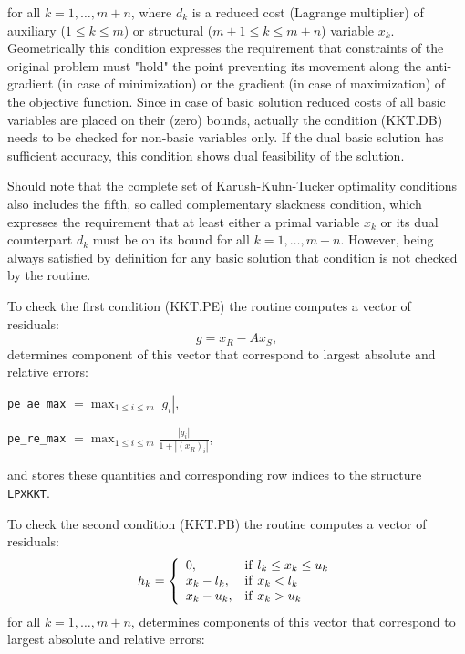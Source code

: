 \medskip

\noindent
for all $k=1,\dots,m+n$, where $d_k$ is a reduced cost (Lagrange
multiplier) of auxiliary ($1\leq k\leq m$) or structural
($m+1\leq k\leq m+n$) variable $x_k$. Geometrically this condition
expresses the requirement that constraints of the original problem must
"hold" the point preventing its movement along the anti-gradient (in
case of minimization) or the gradient (in case of maximization) of the
objective function. Since in case of basic solution reduced costs of
all basic variables are placed on their (zero) bounds, actually the
condition (KKT.DB) needs to be checked for non-basic variables only.
If the dual basic solution has sufficient accuracy, this condition shows
dual feasibility of the solution.

Should note that the complete set of Karush-Kuhn-Tucker optimality
conditions also includes the fifth, so called complementary slackness
condition, which expresses the requirement that at least either a primal
variable $x_k$ or its dual counterpart $d_k$ must be on its bound for
all $k=1,\dots,m+n$. However, being always satisfied by definition for
any basic solution that condition is not checked by the routine.

To check the first condition (KKT.PE) the routine computes a vector of
residuals:
$$g = x_R - A x_S,$$
determines component of this vector that correspond to largest absolute
and relative errors:

\medskip

\hspace{30mm}
\verb|pe_ae_max| $\displaystyle{= \max_{1\leq i\leq m}|g_i|}$,

\medskip

\hspace{30mm}
\verb|pe_re_max| $\displaystyle{= \max_{1\leq i\leq m}
\frac{|g_i|}{1+|(x_R)_i|}}$,

\medskip

\noindent
and stores these quantities and corresponding row indices to the
structure \verb|LPXKKT|.

To check the second condition (KKT.PB) the routine computes a vector
of residuals:
$$
h_k = \left\{
\begin{array}{ll}
0,         & {\rm if}\ l_k \leq x_k \leq u_k \\
x_k - l_k, & {\rm if}\ x_k < l_k \\
x_k - u_k, & {\rm if}\ x_k > u_k \\
\end{array}
\right.
$$
for all $k=1,\dots,m+n$, determines components of this vector that
correspond to largest absolute and relative errors:

